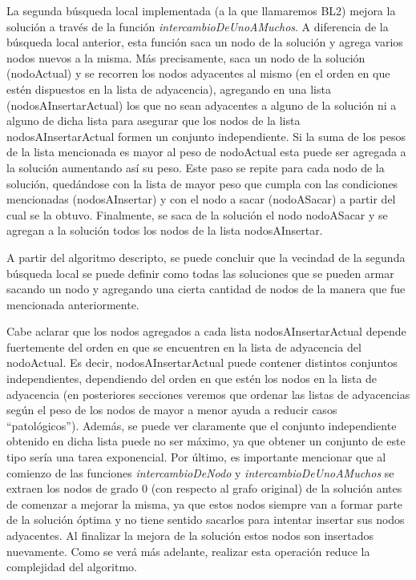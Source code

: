 \documentclass[a4paper,11pt] {article}
\begin{document}
La segunda b\'usqueda local implementada (a la que llamaremos BL2) mejora la soluci\'on a trav\'es de la funci\'on \textit{intercambioDeUnoAMuchos}. A diferencia de la b\'usqueda local anterior, esta funci\'on saca un nodo de la soluci\'on y agrega varios nodos nuevos a la misma. M\'as precisamente, saca un nodo de la soluci\'on (nodoActual) y se recorren los nodos adyacentes al mismo (en el orden en que est\'en dispuestos en la lista de adyacencia), agregando en una lista (nodosAInsertarActual) los que no sean adyacentes a alguno de la soluci\'on ni a alguno de dicha lista para asegurar que los nodos de la lista nodosAInsertarActual formen un conjunto independiente. Si la suma de los pesos de la lista mencionada es mayor al peso de nodoActual esta puede ser agregada a la soluci\'on aumentando as\'i su peso. Este paso se repite para cada nodo de la soluci\'on, qued\'andose con la lista de mayor peso que cumpla con las condiciones mencionadas (nodosAInsertar) y con el nodo a sacar (nodoASacar) a partir del cual se la obtuvo. Finalmente, se saca de la soluci\'on el nodo nodoASacar y se agregan a la soluci\'on todos los nodos de la lista nodosAInsertar.

A partir del algoritmo descripto, se puede concluir que la vecindad de la segunda b\'usqueda local se puede definir como todas las soluciones que se pueden armar sacando un nodo y agregando una cierta cantidad de nodos de la manera que fue mencionada anteriormente.

Cabe aclarar que los nodos agregados a cada lista nodosAInsertarActual depende fuertemente del orden en que se encuentren en la lista de adyacencia del nodoActual. Es decir, nodosAInsertarActual puede contener distintos conjuntos independientes, dependiendo del orden en que est\'en los nodos en la lista de adyacencia (en posteriores secciones veremos que ordenar las listas de adyacencias seg\'un el peso de los nodos de mayor a menor ayuda a reducir casos ``patol\'ogicos''). Adem\'as, se puede ver claramente que el conjunto independiente obtenido en dicha lista puede no ser m\'aximo, ya que obtener un conjunto de este tipo ser\'ia una tarea exponencial. Por \'ultimo, es importante mencionar que al comienzo de las funciones \textit{intercambioDeNodo} y \textit{intercambioDeUnoAMuchos} se extraen los nodos de grado 0 (con respecto al grafo original) de la soluci\'on antes de comenzar a mejorar la misma, ya que estos nodos siempre van a formar parte de la soluci\'on \'optima y no tiene sentido sacarlos para intentar insertar sus nodos adyacentes. Al finalizar la mejora de la soluci\'on estos nodos son insertados nuevamente. Como se ver\'a m\'as adelante, realizar esta operaci\'on reduce la complejidad del algoritmo.
\end{document}
